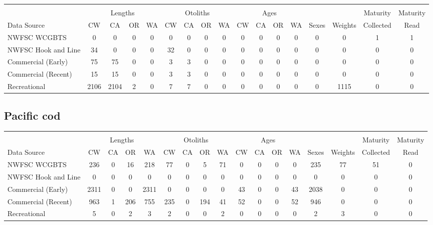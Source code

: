 \documentclass[12pt,]{article}
\begin{document}
\begin{table}[ht]
\centering
\begingroup\fontsize{10pt}{10pt}\selectfont
\begin{tabular}{|l|cccc|cccc|cccc|c|c|c|c|}
  \hline
 &  &  &  &  &  &  &  &  &  &  &  &  &  &  &  &  \\ 
   & \multicolumn{4}{c}{Lengths} &  \multicolumn{4}{c}{Otoliths} & \multicolumn{4}{c}{Ages} &  & & Maturity & Maturity\\
 Data Source & CW & CA & OR & WA & CW & CA & OR & WA & CW & CA & OR & WA & Sexes & Weights & Collected & Read\\
 \hline
NWFSC WCGBTS & 0 & 0 & 0 & 0 & 0 & 0 & 0 & 0 & 0 & 0 & 0 & 0 & 0 & 0 & 1 & 1 \\ 
  NWFSC Hook and Line & 34 & 0 & 0 & 0 & 32 & 0 & 0 & 0 & 0 & 0 & 0 & 0 & 0 & 0 & 0 & 0 \\ 
  Commercial (Early) & 75 & 75 & 0 & 0 & 3 & 3 & 0 & 0 & 0 & 0 & 0 & 0 & 0 & 0 & 0 & 0 \\ 
  Commercial (Recent) & 15 & 15 & 0 & 0 & 3 & 3 & 0 & 0 & 0 & 0 & 0 & 0 & 0 & 0 & 0 & 0 \\ 
  Recreational & 2106 & 2104 & 2 & 0 & 7 & 7 & 0 & 0 & 0 & 0 & 0 & 0 & 0 & 1115 & 0 & 0 \\ 
   \hline
\end{tabular}
\endgroup
\end{table}

\FloatBarrier  

\newpage  

\subsection{Pacific cod}\label{pacific-cod}

\begin{table}[ht]
\centering
\begingroup\fontsize{10pt}{10pt}\selectfont
\begin{tabular}{|l|cccc|cccc|cccc|c|c|c|c|}
  \hline
 &  &  &  &  &  &  &  &  &  &  &  &  &  &  &  &  \\ 
   & \multicolumn{4}{c}{Lengths} &  \multicolumn{4}{c}{Otoliths} & \multicolumn{4}{c}{Ages} &  & & Maturity & Maturity\\
 Data Source & CW & CA & OR & WA & CW & CA & OR & WA & CW & CA & OR & WA & Sexes & Weights & Collected & Read\\
 \hline
NWFSC WCGBTS & 236 & 0 & 16 & 218 & 77 & 0 & 5 & 71 & 0 & 0 & 0 & 0 & 235 & 77 & 51 & 0 \\ 
  NWFSC Hook and Line & 0 & 0 & 0 & 0 & 0 & 0 & 0 & 0 & 0 & 0 & 0 & 0 & 0 & 0 & 0 & 0 \\ 
  Commercial (Early) & 2311 & 0 & 0 & 2311 & 0 & 0 & 0 & 0 & 43 & 0 & 0 & 43 & 2038 & 0 & 0 & 0 \\ 
  Commercial (Recent) & 963 & 1 & 206 & 755 & 235 & 0 & 194 & 41 & 52 & 0 & 0 & 52 & 946 & 0 & 0 & 0 \\ 
  Recreational & 5 & 0 & 2 & 3 & 2 & 0 & 0 & 2 & 0 & 0 & 0 & 0 & 2 & 3 & 0 & 0 \\ 
   \hline
\end{tabular}
\endgroup
\end{table}
\end{document}
